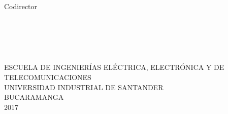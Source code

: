 \noindent \begin{center}
{\large Codirector }\\
{\Large \textsc{\insertcodirector} }\textbf{\large }\\
{\large \insertcargocodirector}
\par\end{center}{\large \par}


\noindent \begin{center}
\textbf{\large ~}
\par\end{center}{\large \par}

\noindent \begin{center}
\textbf{\large ~}
\par\end{center}{\large \par}


\noindent \begin{center}
{\large ESCUELA DE INGENIERÍAS ELÉCTRICA, ELECTRÓNICA Y DE TELECOMUNICACIONES
}\\
{\large UNIVERSIDAD INDUSTRIAL DE SANTANDER}\\
{\large BUCARAMANGA}\\
{\large 2017}
\par\end{center}{\large \par}

